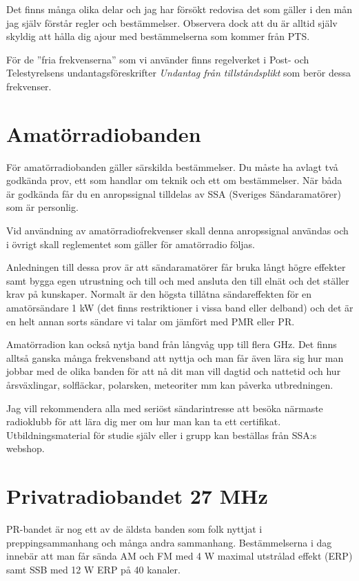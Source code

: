 \documentclass[12ypt,swedish,a4paper]{report}
\begin{document}
Det finns många olika delar och jag har försökt redovisa det som gäller i den mån jag själv förstår regler och bestämmelser. Observera dock att du är alltid själv skyldig att hålla dig ajour med bestämmelserna som kommer från PTS.

För de ''fria frekvenserna'' som vi använder finns regelverket i Post- och Telestyrelsens undantagsföreskrifter \textit{Undantag från tillståndsplikt} som berör dessa frekvenser.

\section{Amatörradiobanden}

För amatörradiobanden gäller särskilda bestämmelser. Du måste ha avlagt två godkända prov, ett som handlar om teknik och ett om bestämmelser. När båda är godkända får du en anropssignal tilldelas av SSA (Sveriges Sändaramatörer) som är personlig.

Vid användning av amatörradiofrekvenser skall denna anropssignal användas och i övrigt skall reglementet som gäller för amatörradio följas. 

Anledningen till dessa prov är att sändaramatörer får bruka långt högre effekter samt bygga egen utrustning och till och med ansluta den till elnät och det ställer krav på kunskaper. Normalt är den högsta tillåtna sändareffekten för en amatörsändare 1 kW (det finns restriktioner i vissa band eller delband) och det är en helt annan sorts sändare vi talar om jämfört med PMR eller PR.

Amatörradion kan också nytja band från långvåg upp till flera GHz. Det finns alltså ganska många frekvensband att nyttja och man får även lära sig hur man jobbar med de olika banden för att nå dit man vill dagtid och nattetid och hur årsväxlingar, solfläckar, polarsken, meteoriter mm kan påverka utbredningen.

Jag vill rekommendera alla med seriöst sändarintresse att besöka närmaste radioklubb för att lära dig mer om hur man kan ta ett certifikat. Utbildningsmaterial för studie själv eller i grupp kan beställas från SSA:s webshop.

\section{Privatradiobandet 27 MHz}

PR-bandet är nog ett av de äldsta banden som folk nyttjat i preppingsammanhang och många andra sammanhang. Bestämmelserna i dag innebär att man får sända AM och FM med 4 W maximal utstrålad effekt (ERP) samt SSB med 12 W ERP på 40 kanaler.
\end{document}
